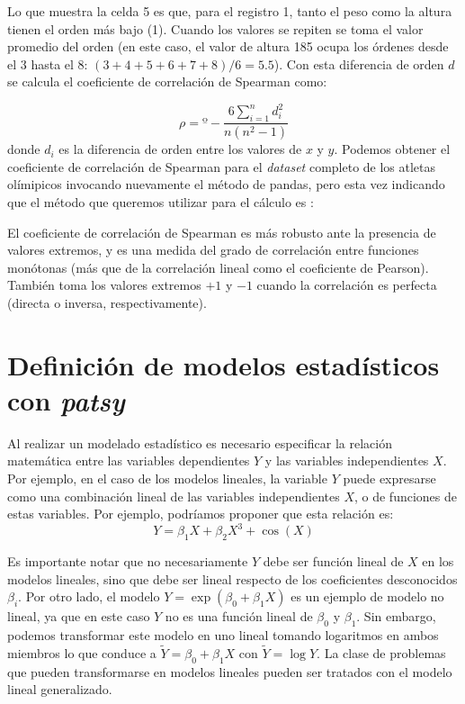 
Lo que muestra la celda 5 es que, para el registro 1, tanto el peso como la altura tienen el orden más bajo (1). Cuando los valores se repiten se toma el valor promedio del orden (en este caso, el valor de altura 185 ocupa los órdenes desde el 3 hasta el 8:  $(3+4+5+6+7+8)/6=5.5$). Con esta diferencia de orden $d$ se calcula el coeficiente de correlación de Spearman como:

\[ \rho = º - \frac{6 \sum\limits_{i=1}^n d_i^2}{n(n^2-1)}  \]
donde $d_i$ es la diferencia de orden entre los valores de $x$ y $y$. Podemos obtener el coeficiente de correlación de Spearman para el \textit{dataset} completo de los atletas olímipicos invocando nuevamente el método  de pandas, pero esta vez indicando que el método que queremos utilizar para el cálculo es :


El coeficiente de correlación de Spearman es más robusto ante la presencia de valores extremos, y es una medida del grado de correlación entre funciones monótonas (más que de la correlación lineal como el coeficiente de Pearson). También toma los valores extremos $+1$ y $-1$ cuando la correlación es perfecta (directa o inversa, respectivamente).


\section{Definición de modelos estadísticos con \textit{patsy}}

Al realizar un modelado estadístico es necesario especificar la relación matemática entre las variables dependientes $Y$ y las variables independientes $X$. Por ejemplo, en el caso de los modelos lineales, la variable $Y$ puede expresarse como una combinación lineal de las variables independientes $X$, o de funciones de estas variables. Por ejemplo, podríamos proponer que esta relación es:
\[ Y = \beta_1 X + \beta_2 X^3 + \cos(X)  \]

Es importante notar que no necesariamente $Y$ debe ser función lineal de $X$ en los modelos lineales, sino que debe ser lineal respecto de los coeficientes desconocidos $\beta_i$. Por otro lado, el modelo $Y = \exp(\beta_0 + \beta_1 X)$ es un ejemplo de modelo no lineal, ya que en este caso $Y$ no es una función lineal de $\beta_0$ y $\beta_1$. Sin embargo, podemos transformar este modelo en uno lineal tomando logaritmos en ambos miembros lo que conduce a $\widetilde{Y} = \beta_0 + \beta_1 X$ con $\widetilde{Y} = \log{Y}$. La clase de problemas que pueden transformarse en modelos lineales pueden ser tratados con el modelo lineal generalizado.

